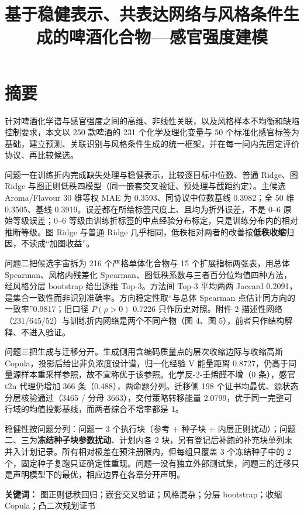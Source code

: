 \documentclass[11pt,a4paper]{article}
\title{基于稳健表示、共表达网络与风格条件生成的啤酒化合物---感官强度建模}
\author{}
\date{}
\begin{document}
\maketitle
\thispagestyle{empty}
\section*{摘要}\label{ux6458ux8981}

针对啤酒化学谱与感官强度之间的高维、非线性关联，以及风格样本不均衡和缺陷控制要求，本文以
250 款啤酒的 231 个化学及理化变量与 50
个标准化感官标签为基础，建立预测、关联识别与风格条件生成的统一框架，并在每一问内先固定评价协议、再比较候选。

问题一在训练折内完成缺失处理与稳健表示，比较逐目标中位数、普通 Ridge、图
Ridge 与图正则低秩四模型（同一嵌套交叉验证、预处理与截距约定）。主候选
Aroma/Flavour 30 维等权 MAE 为 0.3593、同协议中位数基线 0.3982；全 50 维
0.3505、基线 0.3919。误差都在所给标签尺度上、且均为折外误差，不是 0--6
原始等级误差；0--6
等级由训练折标签的中点经验分布标定，只是训练分布内的相对推断等级。图
Ridge 与普通 Ridge
几乎相同，低秩相对两者的改善按\textbf{低秩收缩}归因，不读成``加图收益''。

问题二把候选宇宙拆为 216 个严格单体化合物与 15 个扩展指标两张表，用总体
Spearman、风格内残差化
Spearman、图低秩系数与三者百分位均值四种方法，经风格分层 bootstrap
给出逐维 Top-3。方法间 Top-3 平均两两 Jaccard
0.2091，是集合一致性而非识别准确率。方向稳定性取``与总体 Spearman
点估计同方向的一致率''0.9817；旧口径 \(P(\rho>0)\) 0.7226
只作历史对照。附件 2
描述性网络（231/645/52）与训练折内网络是两个不同产物（图 4、图
5），前者只作结构解释、不进入验证。

问题三把生成与迁移分开。生成侧用含编码质量点的层次收缩边际与收缩高斯
Copula，投影后给出非负浓度设计谱，归一化经验 V 能量距离
0.8727，仍高于同量源样本重采样参照，故不宣称优于该参照。化学反-2-壬烯醛不增（0
条），感官 t2n 代理仍增加 366 条（0.488），两命题分列。迁移侧 198
个证书均最优、源状态分层核验通过（3465 / 分母 3663），交付策略转移能量
2.0799，优于同一完整可行域的均值投影基线，而两者综合不增率都是 1。

稳健性按问题分列：问题一 3 个执行块（参考 + 种子块 +
内层正则扰动）；问题二、三为\textbf{冻结种子块参数扰动}、计划内各 2
块，另有登记后补跑的补充块单列未并入计划记录。所有相对极差在预注册限内，但每组只覆盖
3 个冻结种子中的 2
个，固定种子复跑只证确定性重现。问题一没有独立外部测试集，问题三的迁移只是声明模型下的最优，相应边界在各章分开声明。

\textbf{关键词：} 图正则低秩回归；嵌套交叉验证；风格混杂；分层
bootstrap；收缩 Copula；凸二次规划证书
\end{document}
